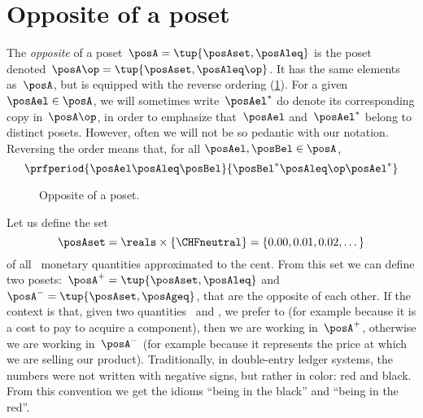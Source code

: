 
\section{Opposite of a poset}\label{sec:opposite-of-a-poset}

\begin{definition}
    \label{def:poset-opposite}
    The \emph{opposite} of a poset~$\posA=\tup{\posAset, \posAleq}$ is the poset denoted~$\posA\op=\tup{\posAset, \posAleq\op}$.
    It has the same elements as~$\posA$, but is equipped with the reverse ordering (\cref{fig:poset-opposite}).
    For a given~$\posAel \in \posA$, we will sometimes write~$\posAel^*$ do denote its corresponding copy in~$\posA\op$, in order to emphasize that~$\posAel$ and~$\posAel^*$ belong to distinct posets.
    However, often we will not be so pedantic with our notation.
    Reversing the order means that, for all $\posAel,\posBel\in \posA$,
    \begin{equation}
        \prfperiod{\posAel \posAleq \posBel}{\posBel^* \posAleq\op \posAel^*}
    \end{equation}
\end{definition}

\begin{figure}[tbh]
    \centering
    \caption{Opposite of a poset.}
    \label{fig:poset-opposite}
\end{figure}

\begin{example}
    Let us define the set
    \begin{equation*}
        \posAset=\reals \times \{\text{\CHFneutral}\}=\{0.00,0.01,0.02,\dots\}
    \end{equation*}
    of all \CHFneutral \ monetary quantities approximated to the cent.
    From this set we can define two posets:~$\posA^{+} = \tup{\posAset, \posAleq}$ and~$\posA^{-} = \tup{\posAset, \posAgeq}$, that are the opposite of each other.
    If the context is that, given two quantities~\unit[1]{\CHFneutral} and \unit[2]{\CHFneutral}, we prefer \unit[1]{\CHFneutral} to \unit[2]{\CHFneutral} (for example because it is a cost to pay to acquire a component), then we are working in~$\posA^{+}$, otherwise we are working in~$\posA^{-}$ (for example because it represents the price at which we are selling our product).
    Traditionally, in double-entry ledger systems, the numbers were not written with negative signs, but rather in color: red and black.
    From this convention we get the idioms ``being in the black'' and ``being in the red''.
\end{example}
